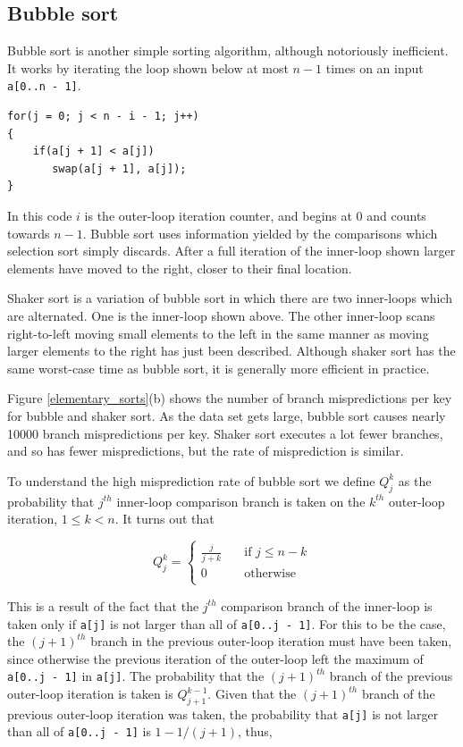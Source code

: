 \documentclass[acmtocl]{acmtrans2m}
\begin{document}
\subsection{Bubble sort}
\label{bubble_sort}

Bubble sort is another simple sorting algorithm, although notoriously
inefficient. It works by iterating the loop shown below at most $n - 1$
times on an input \texttt{a[0..n - 1]}.

\begin{verbatim}
for(j = 0; j < n - i - 1; j++)
{
    if(a[j + 1] < a[j])
       swap(a[j + 1], a[j]);
}
\end{verbatim} 
In this code $i$ is the outer-loop iteration counter, and begins at 0 and counts
towards $n - 1$. Bubble sort uses
information yielded by the comparisons which selection
sort simply discards. After a full iteration of the inner-loop shown larger
elements have moved to the right, closer to their final location.

Shaker sort is a variation of bubble sort in which there are two inner-loops
which are alternated. One is the inner-loop shown above. The other
inner-loop scans right-to-left moving small elements to the left in the
same manner as moving larger elements to the right has just been described.
Although shaker sort has the same worst-case time as bubble sort, it is generally
more efficient in practice.

Figure \ref{elementary_sorts}(b) shows the number of branch mispredictions per key for
bubble and shaker sort. As the data set gets large, bubble sort causes nearly 10000
branch mispredictions per key. Shaker sort executes a lot fewer
branches, and so has fewer mispredictions, but the rate of
misprediction is similar.

To understand the high misprediction rate of bubble sort we define $Q^k_j$
as the probability that $j^{th}$ inner-loop comparison branch is taken on the $k^{th}$ 
outer-loop iteration, $1 \leq k < n$. It turns out that

\begin{equation}
\label{bubble_equation}
Q^k_j = 
\left\{ 
\begin{array}{ll}
  \frac{j}{j + k} & \quad \mbox{if $j \leq n - k$}\\
  0 & \quad \mbox{otherwise}\\ 
\end{array} 
\right. 
\end{equation}

\noindent
This is a result of the fact that the $j^{th}$ comparison branch of the inner-loop
is taken only if \texttt{a[j]} is not larger than all of \texttt{a[0..j - 1]}.
For this
to be the case, the $(j + 1)^{th}$ branch in the previous outer-loop iteration must have been taken,
since otherwise the previous iteration of the outer-loop left the maximum of \texttt{a[0..j - 1]} in \texttt{a[j]}.
The probability that the $(j + 1)^{th}$ branch of the
previous outer-loop iteration is taken is $Q^{k - 1}_{j + 1}$. Given that the $(j + 1)^{th}$ branch of
the previous outer-loop iteration was taken, the probability that \texttt{a[j]} is
not larger than all of \texttt{a[0..j - 1]} is $1 - 1/(j + 1)$, thus,
\end{document}
